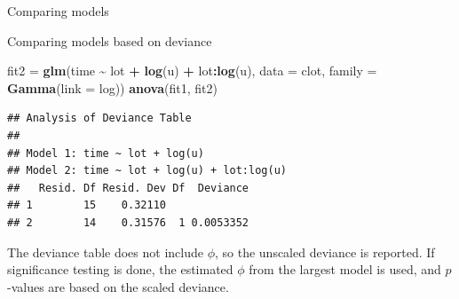 \documentclass[
  ignorenonframetext,
]{beamer}
\newenvironment{Shaded}{\begin{snugshade}}{\end{snugshade}}
\newcommand{\AttributeTok}[1]{\textcolor[rgb]{0.13,0.29,0.53}{#1}}
\newcommand{\FunctionTok}[1]{\textcolor[rgb]{0.13,0.29,0.53}{\textbf{#1}}}
\newcommand{\NormalTok}[1]{#1}
\newcommand{\OtherTok}[1]{\textcolor[rgb]{0.56,0.35,0.01}{#1}}
\newcommand{\SpecialCharTok}[1]{\textcolor[rgb]{0.81,0.36,0.00}{\textbf{#1}}}
\begin{document}
\begin{frame}[fragile]{Comparing models}
\protect\hypertarget{comparing-models}{}
\begin{block}{Comparing models based on deviance}
\protect\hypertarget{comparing-models-based-on-deviance}{}
\begin{Shaded}
\begin{Highlighting}[]
\NormalTok{fit2 }\OtherTok{=} \FunctionTok{glm}\NormalTok{(time }\SpecialCharTok{\textasciitilde{}}\NormalTok{ lot }\SpecialCharTok{+} \FunctionTok{log}\NormalTok{(u) }\SpecialCharTok{+}\NormalTok{ lot}\SpecialCharTok{:}\FunctionTok{log}\NormalTok{(u), }\AttributeTok{data =}\NormalTok{ clot, }\AttributeTok{family =} \FunctionTok{Gamma}\NormalTok{(}\AttributeTok{link =}\NormalTok{ log))}
\FunctionTok{anova}\NormalTok{(fit1, fit2)}
\end{Highlighting}
\end{Shaded}

\begin{verbatim}
## Analysis of Deviance Table
## 
## Model 1: time ~ lot + log(u)
## Model 2: time ~ lot + log(u) + lot:log(u)
##   Resid. Df Resid. Dev Df  Deviance
## 1        15    0.32110             
## 2        14    0.31576  1 0.0053352
\end{verbatim}

The deviance table does not include \(\phi\), so the unscaled deviance
is reported. If significance testing is done, the estimated \(\phi\)
from the largest model is used, and \(p\)-values are based on the scaled
deviance.
\end{block}
\end{frame}
\end{document}
